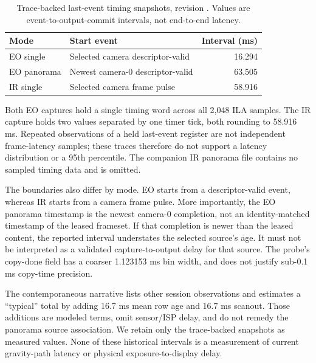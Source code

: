 \begin{table}[t]
\centering
\caption{Trace-backed last-event timing snapshots, revision . Values are event-to-output-commit intervals, not end-to-end latency.}
\label{tab:latency_snapshots}
\small
\begin{tabularx}{\columnwidth}{lYr}
\toprule
Mode & Start event & Interval (ms) \\
\midrule
EO single & Selected camera descriptor-valid & 16.294 \\
EO panorama & Newest camera-0 descriptor-valid & 63.505 \\
IR single & Selected camera frame pulse & 58.916 \\
\bottomrule
\end{tabularx}
\end{table}

Both EO captures hold a single timing word across all 2,048 ILA samples. The IR capture holds two values separated by one timer tick, both rounding to 58.916 ms. Repeated observations of a held last-event register are not independent frame-latency samples; these traces therefore do not support a latency distribution or a 95th percentile. The companion IR panorama file contains no sampled timing data and is omitted.

The boundaries also differ by mode. EO starts from a descriptor-valid event, whereas IR starts from a camera frame pulse. More importantly, the EO panorama timestamp is the newest camera-0 completion, not an identity-matched timestamp of the leased frameset. If that completion is newer than the leased content, the reported interval understates the selected source's age. It must not be interpreted as a validated capture-to-output delay for that source. The probe's copy-done field has a coarser 1.123153 ms bin width, and does not justify sub-0.1 ms copy-time precision.

The contemporaneous narrative lists other session observations and estimates a ``typical'' total by adding 16.7 ms mean row age and 16.7 ms scanout. Those additions are modeled terms, omit sensor/ISP delay, and do not remedy the panorama source association. We retain only the trace-backed snapshots as measured values. None of these historical intervals is a measurement of current gravity-path latency or physical exposure-to-display delay.


